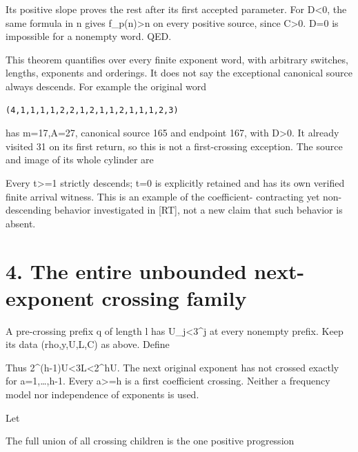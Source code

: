 
Its positive slope proves the rest after its first accepted parameter.
For D\textless0, the same formula in n gives f\_p(n)\textgreater n on
every positive source, since C\textgreater0. D=0 is impossible for a
nonempty word. QED.

This theorem quantifies over every finite exponent word, with arbitrary
switches, lengths, exponents and orderings. It does not say the
exceptional canonical source always descends. For example the original
word

\begin{Verbatim}[breaklines=true,breakanywhere=true,fontsize=\scriptsize]
(4,1,1,1,1,2,2,1,2,1,1,2,1,1,1,2,3)
\end{Verbatim}

has m=17,A=27, canonical source 165 and endpoint 167, with
D\textgreater0. It already visited 31 on its first return, so this is
not a first-crossing exception. The source and image of its whole
cylinder are


Every t\textgreater=1 strictly descends; t=0 is explicitly retained and
has its own verified finite arrival witness. This is an example of the
coefficient- contracting yet non-descending behavior investigated in
{[}RT{]}, not a new claim that such behavior is absent.

\section{4. The entire unbounded next-exponent crossing family}

A pre-crossing prefix q of length l has U\_j\textless3\^{}j at every
nonempty prefix. Keep its data (rho,y,U,L,C) as above. Define


Thus 2\^{}(h-1)U\textless3L\textless2\^{}hU. The next original exponent
has not crossed exactly for a=1,\ldots,h-1. Every a\textgreater=h is a
first coefficient crossing. Neither a frequency model nor independence
of exponents is used.

Let

 

The full union of all crossing children is the one positive progression

